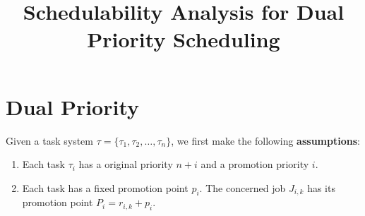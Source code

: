 \documentclass[12pt,conference,twocolumn]{IEEEtran}
\begin{document}
  
\title{Schedulability Analysis for Dual Priority Scheduling}  
\maketitle  








\section{Dual Priority}
Given a task system $\tau=\{\tau_1,\tau_2,\ldots, \tau_n\}$, we first make the following \textbf{assumptions}:
\begin{enumerate}
	\item Each task  $\tau_i$ has a original priority $n+i$ and a promotion priority $i$.
	\item Each task has a fixed promotion point $p_i$. The concerned job $J_{i,k}$ has its promotion point $P_i=r_{i,k}+p_i$.
\end{enumerate}
\end{document}
